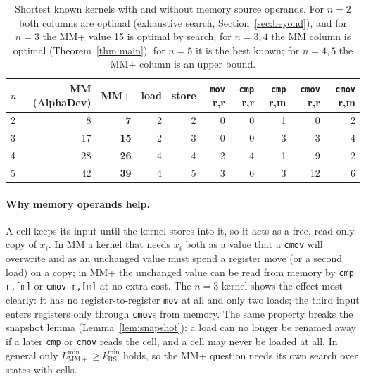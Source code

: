 \begin{table}[h]\centering\small
\begin{tabular}{lrrrrrrrrr}\toprule
$n$ & MM (AlphaDev) & MM+ & load & store & \texttt{mov} r,r & \texttt{cmp} r,r & \texttt{cmp} r,m & \texttt{cmov} r,r & \texttt{cmov} r,m \\\midrule
2 & 8  & \textbf{7}  & 2 & 2 & 0 & 0 & 1 & 0 & 2 \\
3 & 17 & \textbf{15} & 2 & 3 & 0 & 0 & 3 & 3 & 4 \\
4 & 28 & \textbf{26} & 4 & 4 & 2 & 4 & 1 & 9 & 2 \\
5 & 42 & \textbf{39} & 4 & 5 & 3 & 6 & 3 & 12 & 6 \\\bottomrule
\end{tabular}
\caption{Shortest known kernels with and without memory source operands. For $n = 2$ both columns are optimal
(exhaustive search, Section~\ref{sec:beyond}), and for $n = 3$ the MM+ value 15 is optimal by search; for $n = 3, 4$ the MM
column is optimal (Theorem~\ref{thm:main}), for $n = 5$ it is the best known; for $n = 4, 5$ the MM+ column is an upper bound.}
\label{tab:beyond}
\end{table}

\paragraph{Why memory operands help.} A cell keeps its input until the kernel stores into it, so it acts as a free,
read-only copy of $x_i$. In MM a kernel that needs $x_i$ both as a value that a \texttt{cmov} will overwrite and as an
unchanged value must spend a register move (or a second load) on a copy; in MM+ the unchanged value can be read from memory by
\texttt{cmp r,[m]} or \texttt{cmov r,[m]} at no extra cost. The $n = 3$ kernel shows the effect most clearly: it has no
register-to-register \texttt{mov} at all and only two loads; the third input enters registers only through \texttt{cmov}s from
memory. The same property breaks the snapshot lemma (Lemma~\ref{lem:snapshot}): a load can no longer be renamed away if a later
\texttt{cmp} or \texttt{cmov} reads the cell, and a cell may never be loaded at all. In general only
$L^{\min}_{\mathrm{MM+}} \ge k^{\min}_{\mathrm{RS}}$ holds, so the MM+ question needs its own search over states with cells.

